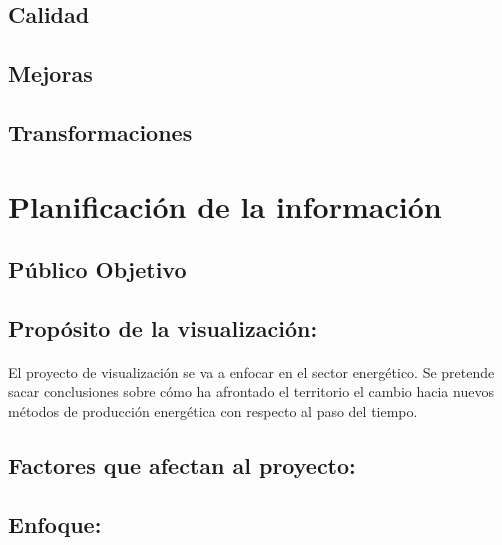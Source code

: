 \documentclass{article}
\begin{document}
			
			
			
			
			\paragraph{}
			

		\subsection{Calidad}
		
		\subsection{Mejoras}
		
		\subsection{Transformaciones}


	\section{Planificación de la información}
	
		\subsection{Público Objetivo}
		

		\subsection{Propósito de la visualización:}
	
			\paragraph{}
			El proyecto de visualización se va a enfocar en el sector energético. Se pretende sacar conclusiones sobre cómo ha afrontado el territorio el cambio hacia nuevos métodos de producción energética con respecto al paso del tiempo.


		\subsection{Factores que afectan al proyecto:}


		\subsection{Enfoque:}
\end{document}
